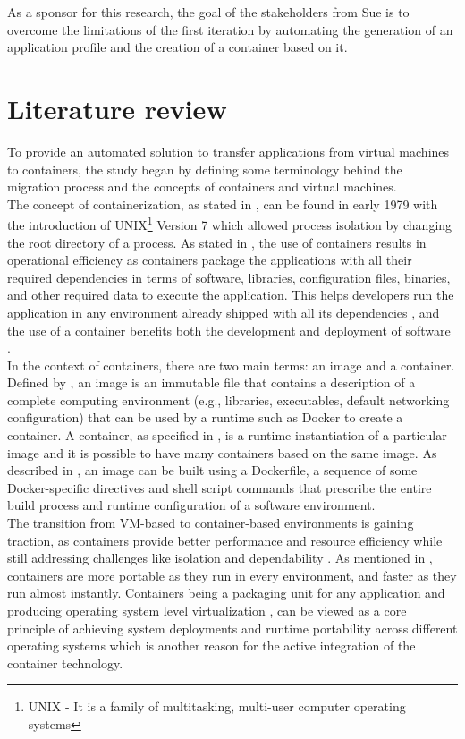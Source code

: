 \documentclass[twocolumn]{article}
\begin{document}
As a sponsor for this research, the goal of the stakeholders from Sue is to overcome the limitations of the first iteration by automating the generation of an application profile and the creation of a container based on it.

\section{Literature review}
To provide an automated solution to transfer applications from virtual machines to containers, the study began by defining some terminology behind the migration process and the concepts of containers and virtual machines. \\

The concept of containerization, as stated in \cite{Bhat-2022}, can be found in early 1979 with the introduction of UNIX\footnote{UNIX - It is a family of multitasking, multi-user computer operating systems} Version 7 which allowed process isolation by changing the root directory of a process. As stated in \cite{SiddiquiEtAl-2020}, the use of containers results in operational efficiency as containers package the applications with all their required dependencies in terms of software, libraries, configuration files, binaries, and other required data to execute the application. This helps developers run the application in any environment already shipped with all its dependencies \cite{SiddiquiEtAl-2020}, and the use of a container benefits both the development and deployment of software \cite{VermaEtAl-2022}. \\ 

In the context of containers, there are two main terms: an image and a container. Defined by \cite{HaleEtAl-2017}, an image is an immutable file that contains a description of a complete computing environment (e.g., libraries, executables, default networking configuration) that can be used by a runtime such as Docker to create a container. A container, as specified in \cite{HaleEtAl-2017}, is a runtime instantiation of a particular image and it is possible to have many containers based on the same image. As described in \cite{HaleEtAl-2017}, an image can be built using a Dockerfile, a sequence of some Docker-specific directives and shell script commands that prescribe the entire build process and runtime configuration of a software environment. \\

The transition from VM-based to container-based environments is gaining traction, as containers provide better performance and resource efficiency while still addressing challenges like isolation and dependability \cite{GargEtAl-2024}. As mentioned in \cite{Yade-2022}, containers are more portable as they run in every environment, and faster as they run almost instantly. Containers being a packaging unit for any application and producing operating system level virtualization \cite{SiddiquiEtAl-2020}, can be viewed as a core principle of achieving system deployments and runtime portability across different operating systems which is another reason for the active integration of the container technology. \\
\end{document}
